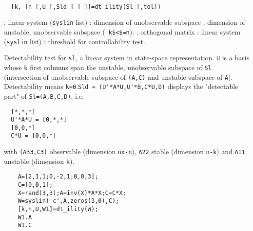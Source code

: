 \begin{mandesc}
   \\ %
\end{mandesc}
\begin{calling_sequence}
\begin{verbatim}
  [k, [n [,U [,Sld ] ] ]]=dt_ility(Sl [,tol])  
\end{verbatim}
\end{calling_sequence}
\begin{parameters}
  \begin{varlist}
    : linear system (\verb!syslin! list)
    : dimension of unobservable subspace
    : dimension of unstable, unobservable subspace (\verb! k$<$=n!).
    : orthogonal matrix
    : linear system (\verb!syslin! list)
    : threshold for controllability test.
  \end{varlist}
\end{parameters}
\begin{mandescription}
  Detectability test for \verb!sl!, a linear system in state-space
  representation.  \verb!U! is a basis whose \verb!k! first columns span the
  unstable, unobservable subspace of \verb!Sl! (intersection of unobservable
  subspace of \verb!(A,C)! and unstable subspace of \verb!A!). Detectability
  means \verb!k=0!.\verb!Sld = (U'*A*U,U'*B,C*U,D)! displays the "detectable
  part" of \verb!Sl=(A,B,C,D)!, i.e.
\begin{verbatim}
  [*,*,*]
  U'*A*U = [0,*,*]
  [0,0,*]
  C*U = [0,0,*]
\end{verbatim}
with \verb!(A33,C3)! observable (dimension \verb!nx-n!), \verb!A22! stable 
(dimension \verb!n-k!) and \verb!A11! unstable (dimension \verb!k!).
\end{mandescription}
\begin{examples}
  \begin{Verbatim}
    A=[2,1,1;0,-2,1;0,0,3];
    C=[0,0,1];
    X=rand(3,3);A=inv(X)*A*X;C=C*X;
    W=syslin('c',A,zeros(3,0),C);
    [k,n,U,W1]=dt_ility(W);
    W1.A
    W1.C
  \end{Verbatim}
\end{examples}
\begin{manseealso}
       
\end{manseealso}
